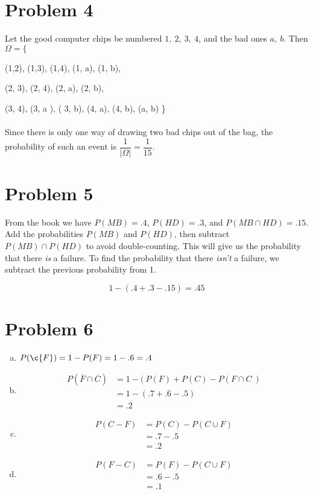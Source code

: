 \documentclass[11pt]{article}
\begin{document}
\section*{Problem 4}
	Let the good computer chips be numbered $1,\ 2,\ 3,\ 4$, and the bad ones $a,\ b$. Then $\Omega = \{ $ 
	
	(1,2),  (1,3), (1,4), (1, a), (1, b),
	
	(2, 3), (2, 4), (2, a), (2, b),
	
	(3, 4), (3, a ), ( 3, b), (4, a), (4, b), (a, b) \}\\\\
	Since there is only one way of drawing two bad chips out of the bag, the probability of such an event is $\dfrac{1}{|\Omega|} = \dfrac{1}{15}$.
	
	
\section*{Problem 5}
	From the book we have $P( MB ) = .4$, $P( HD) = .3$, and $ P( MB \cap HD ) = .15$. Add the probabilities $P( MB )$ and $ P( HD)$, then subtract $P( MB ) \cap P(HD)$ to avoid double-counting. This will give us the probability that there \textit{is} a failure. To find the probability that there \textit{isn't} a failure, we subtract the previous probability from 1. 
	
	\[1- (.4 + .3 -.15) =  .45\]
	
\section*{Problem 6}
	\begin{enumerate}[(a)]
		\item $P( \c{F} ) = 1 - P( F ) = 1-.6 = .4$
		\item \begin{align*}
			P( \overline{F} \cap \overline{C} ) &= 1- (\ P( F) + P( C ) - P(F \cap C\ ) \\
			&= 1-(.7 + .6 - .5)\\
			&= .2
		\end{align*}
		
		\item
		\begin{align*}
		P( C - F ) &= P(C) - P ( C \cup F )\\
		&= .7-.5\\
		&= .2
		\end{align*}
		
		\item
		\hfill \begin{align*}
		P( F - C ) &= P(F) - P( C \cup F)\\
		&= .6 -.5\\
		&= .1
		\end{align*}

	\end{enumerate}

	
	  
	  
	
	
	
	
	
\end{document}
